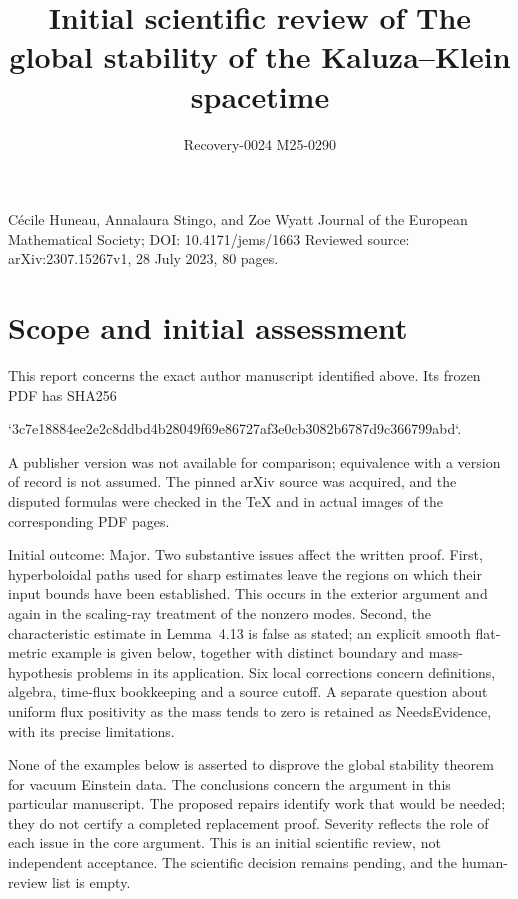 \documentclass[10pt]{article}
\title{Initial scientific review of
The global stability of the Kaluza–Klein spacetime}
\author{}
\date{Recovery-0024 M25-0290}
\begin{document}
\maketitle
Cécile Huneau, Annalaura Stingo, and Zoe Wyatt
Journal of the European Mathematical Society; DOI: 10.4171/jems/1663
Reviewed source: arXiv:2307.15267v1, 28 July 2023, 80 pages.\par
\section*{Scope and initial assessment}
This report concerns the exact author manuscript identified above. Its frozen PDF has SHA256\par
`3c7e18884ee2e2c8ddbd4b28049f69e86727af3e0cb3082b6787d9c366799abd`.\par
A publisher version was not available for comparison; equivalence with a version of record is not assumed. The pinned arXiv source was acquired, and the disputed formulas were checked in the TeX and in actual images of the corresponding PDF pages.\par
Initial outcome: Major. Two substantive issues affect the written proof. First, hyperboloidal paths used for sharp estimates leave the regions on which their input bounds have been established. This occurs in the exterior argument and again in the scaling-ray treatment of the nonzero modes. Second, the characteristic estimate in Lemma 4.13 is false as stated; an explicit smooth flat-metric example is given below, together with distinct boundary and mass-hypothesis problems in its application. Six local corrections concern definitions, algebra, time-flux bookkeeping and a source cutoff. A separate question about uniform flux positivity as the mass tends to zero is retained as NeedsEvidence, with its precise limitations.\par
None of the examples below is asserted to disprove the global stability theorem for vacuum Einstein data. The conclusions concern the argument in this particular manuscript. The proposed repairs identify work that would be needed; they do not certify a completed replacement proof. Severity reflects the role of each issue in the core argument. This is an initial scientific review, not independent acceptance. The scientific decision remains pending, and the human-review list is empty.\par
\end{document}
